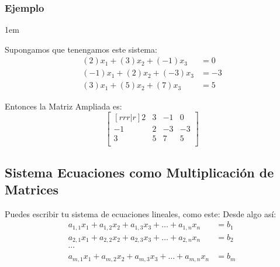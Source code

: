 \documentclass[12pt, fleqn]{report}                             %
\newenvironment{SmallIndentation}[1][0.75em]                    %
        {\begin{adjustwidth}{#1}{}\begin{footnotesize}}             %
        {\end{footnotesize}\end{adjustwidth}}                       %
\theoremstyle{break}                                            %
\begin{document}
                \subsubsection{Ejemplo}
                \begin{SmallIndentation}[1em]
                    
                    Supongamos que tenengamos este sistema:
                    \begin{align*}
                        (2)x_1  +  (3)x_2 + (-1)x_3 &= 0    \\
                        (-1)x_1 +  (2)x_2 + (-3)x_3 &= -3   \\
                        (3)x_1  +  (5)x_2 + (7)x_3  &= 5    
                    \end{align*}

                    Entonces la Matriz Ampliada es:
                    \begin{equation*}
                        \begin{bmatrix}[rrr|r]
                            2  & 3 & -1 & 0  \\
                            -1 & 2 & -3 & -3 \\
                            3  & 5 & 7  & 5  \\
                        \end{bmatrix}
                    \end{equation*}

                \end{SmallIndentation}


            \clearpage
            \subsection{Sistema Ecuaciones como Multiplicación de Matrices}

                Puedes escribir tu sistema de ecuaciones lineales, como este:
                Desde algo así:
                \begin{align*}
                    a_{1,1}x_1 + a_{1,2}x_2 + a_{1,3}x_3 + \dots + a_{1,n}x_n &= b_1    \\
                    a_{2,1}x_1 + a_{2,2}x_2 + a_{2,3}x_3 + \dots + a_{2,n}x_n &= b_2    \\
                    \cdots                                                              \\
                    a_{m,1}x_1 + a_{m,2}x_2 + a_{m,3}x_3 + \dots + a_{m,n}x_n &= b_m
                \end{align*}
\end{document}
